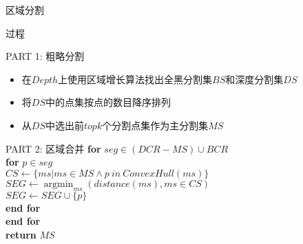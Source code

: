 \documentclass[xcolor=table,compress,blue]{beamer}
\begin{document}
	\begin{frame}{区域分割}
		\vspace{-10pt}
		\begin{exampleblock}{过程}
		\end{exampleblock}
		\vspace{-18pt}
		\begin{exampleblock}{\small{PART 1: 粗略分割}}
			\begin{itemize}
				\item 在$Depth$上使用区域增长算法找出全黑分割集$BS$和深度分割集$DS$ 
				\item 将$DS$中的点集按点的数目降序排列
				\item 从$DS$中选出前$topk$个分割点集作为主分割集$MS$
			\end{itemize}
		\end{exampleblock}
		\vspace{-15pt}
		\begin{exampleblock}{\small{PART 2: 区域合并}}
			\textbf{for} {$seg \in  (DCR - MS) \cup BCR$}
			\\ \quad \textbf{for} {$p \in seg$}
			\\ \quad \quad $CS \leftarrow \{ms|ms \in MS \wedge p\ in\ ConvexHull(ms)\}$
			\\ \quad \quad $SEG \leftarrow \mathop{\arg\min}_{ms}(distance(ms), ms\in CS)$	
			\\ \quad \quad $SEG \leftarrow SEG \cup \{p\}$
			\\ \quad \textbf{end for}
			\\ \textbf{end for} 
			\\ \textbf{return} $MS$
		\end{exampleblock}
	\end{frame}
	
\end{document}
